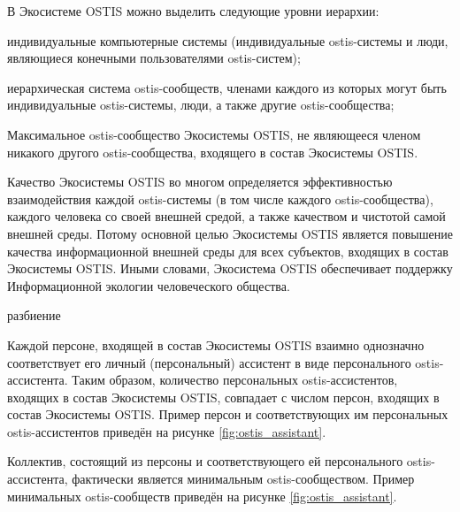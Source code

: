 В Экосистеме OSTIS можно выделить следующие уровни иерархии:
\begin{textitemize}
    \item индивидуальные компьютерные системы (индивидуальные ostis-системы и люди, являющиеся конечными пользователями ostis-систем);
    \item иерархическая система ostis-сообществ, членами каждого из которых могут быть индивидуальные ostis-системы, люди, а также другие ostis-сообщества;
    \item Максимальное ostis-сообщество Экосистемы OSTIS, не являющееся членом никакого другого ostis-сообщества, входящего в состав Экосистемы OSTIS.
\end{textitemize}

Качество Экосистемы OSTIS во многом определяется эффективностью взаимодействия каждой ostis-системы (в том числе каждого ostis-сообщества), каждого человека со своей внешней средой, а также качеством и чистотой самой внешней среды. 
Потому основной целью Экосистемы OSTIS является повышение качества информационной внешней среды для всех субъектов, входящих в состав Экосистемы OSTIS.
Иными словами, Экосистема OSTIS обеспечивает поддержку Информационной экологии человеческого общества.

\begin{SCn}
\begin{scnrelfromset}{разбиение}
\end{scnrelfromset}
\end{SCn}

Каждой персоне, входящей в состав Экосистемы OSTIS взаимно однозначно соответствует его личный (персональный) ассистент в виде персонального ostis-ассистента.
Таким образом, количество персональных ostis-ассистентов, входящих в состав Экосистемы OSTIS, совпадает с числом персон, входящих в состав Экосистемы OSTIS.
Пример персон и соответствующих им персональных ostis-ассистентов приведён на рисунке \ref{fig:ostis_assistant}.


Коллектив, состоящий из персоны и соответствующего ей персонального ostis-ассистента, фактически является минимальным ostis-сообществом.
Пример минимальных ostis-сообществ приведён на рисунке \ref{fig:ostis_assistant}.

